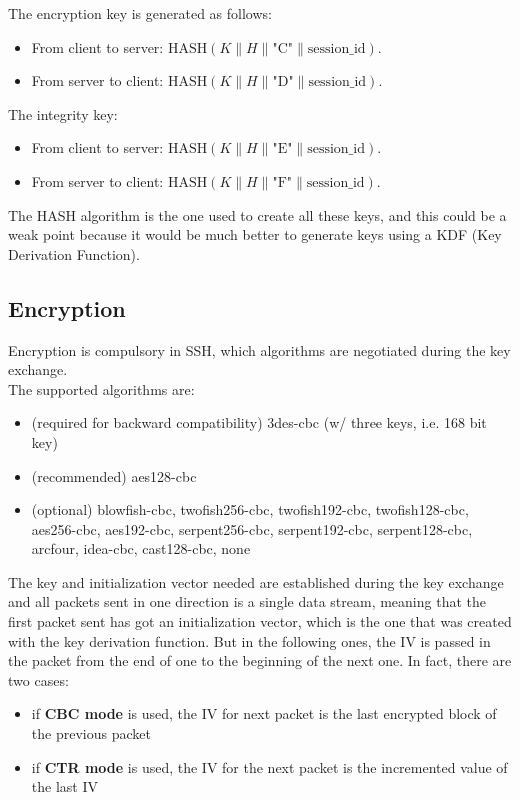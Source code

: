 The encryption key is generated as follows:

\begin{itemize}
    \item From client to server: 
    $\text{HASH}(K \parallel H \parallel \text{"C"} \parallel \text{session\_id})$.
    
    \item From server to client: 
    $\text{HASH}(K \parallel H \parallel \text{"D"} \parallel \text{session\_id})$.
\end{itemize}

The integrity key:

\begin{itemize}
    \item From client to server: 
    $\text{HASH}(K \parallel H \parallel \text{"E"} \parallel \text{session\_id})$.
    
    \item From server to client: 
    $\text{HASH}(K \parallel H \parallel \text{"F"} \parallel \text{session\_id})$.
\end{itemize}

The HASH algorithm is the one used to create all these keys, and this could be a weak point because it would
be much better to generate keys using a KDF (Key Derivation Function).

\subsection{Encryption}
Encryption is compulsory in SSH, which algorithms are negotiated
during the key exchange.\\
The supported algorithms are:
\begin{itemize}
  \item (required for backward compatibility) 3des-cbc (w/ three keys,
    i.e. 168 bit key)
  \item(recommended) aes128-cbc
  \item(optional) blowfish-cbc, twofish256-cbc, twofish192-cbc,
    twofish128-cbc, aes256-cbc, aes192-cbc, serpent256-cbc,
    serpent192-cbc, serpent128-cbc, arcfour, idea-cbc, cast128-cbc,
    none
\end{itemize}
The key and initialization vector needed are established during the
key exchange and all packets sent in one direction is a single data
stream, meaning that the first packet sent has got an initialization
vector, which is the one that was created with the key derivation
function. But in the following ones, the IV is passed in the packet 
from the end of one to the beginning of the next one. In fact, there
are two cases:
\begin{itemize}
  \item if \textbf{CBC mode} is used, the IV for next packet is the
    last encrypted block of the previous packet
  \item if \textbf{CTR mode} is used, the IV for the next packet is
    the incremented value of the last IV
\end{itemize}

